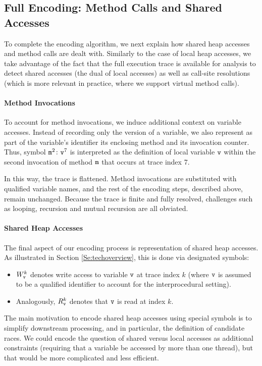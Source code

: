 \subsection{Full Encoding: Method Calls and Shared Accesses}

To complete the encoding algorithm, we next explain how shared heap accesses and method calls are dealt with. Similarly to the case of local heap accesses, we take advantage of the fact that the full execution trace is available for analysis to detect shared accesses (the dual of local accesses) as well as call-site resolutions (which is more relevant in practice, where we support virtual method calls).

\paragraph{Method Invocations} To account for method invocations, we induce additional context on variable accesses. Instead of recording only the version of a variable, we also represent as part of the variable's identifier its enclosing method and its invocation counter. Thus, symbol ${\tt m}^2 \colon {\tt v}^7$ is interpreted as the definition of local variable ${\tt v}$ within the second invocation of method ${\tt m}$ that occurs at trace index 7.

In this way, the trace is flattened. Method invocations are substituted with qualified variable names, and the rest of the encoding steps, described above, remain unchanged. Because the trace is finite and fully resolved, challenges such as looping, recursion and mutual recursion are all obviated.

\paragraph{Shared Heap Accesses} The final aspect of our encoding process is representation of shared heap accesses. As illustrated in Section \ref{Se:techoverview}, this is done via designated symbols:
\begin{itemize}
	\item $W^{k}_{\tt v}$ denotes write access to variable ${\tt v}$ at trace index $k$ (where ${\tt v}$ is assumed to be a qualified identifier to account for the interprocedural setting).
	\item Analogously, $R^{k}_{\tt v}$ denotes that ${\tt v}$ is read at index $k$.
\end{itemize}

The main motivation to encode shared heap accesses using special symbols is to simplify downstream processing, and in particular, the definition of candidate races. We could encode the question of shared versus local accesses as additional constraints (requiring that a variable be accessed by more than one thread), but that would be more complicated and less efficient.


